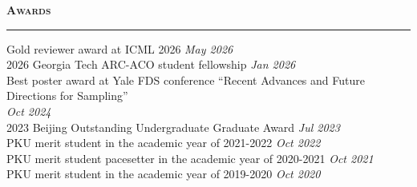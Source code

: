 \documentclass{resume} %
\renewenvironment{rSection}[1]{
\sectionskip
\textcolor{LinkNavy}{\textbf{\textsc{#1}}}
\sectionlineskip
\hrule
\begin{list}{}{
\setlength{\leftmargin}{1.5em}
}
\item[]
}{
\end{list}
}
\begin{document}
\begin{rSection}{Awards} \itemsep -2pt
    Gold reviewer award at ICML 2026 \hfill {\em May 2026} \\
    2026 Georgia Tech ARC-ACO student fellowship \hfill {\em Jan 2026} \\
    Best poster award at Yale FDS conference ``Recent Advances and Future Directions for Sampling'' \\
    \phantom{.} \hfill {\em Oct 2024} \\
    2023 Beijing Outstanding Undergraduate Graduate Award \hfill {\em Jul 2023} \\
    PKU merit student in the academic year of 2021-2022 \hfill {\em Oct 2022} \\
    PKU merit student pacesetter in the academic year of 2020-2021 \hfill {\em Oct 2021} \\
    PKU merit student in the academic year of 2019-2020 \hfill {\em Oct 2020} \\
\end{rSection}


\end{document}
